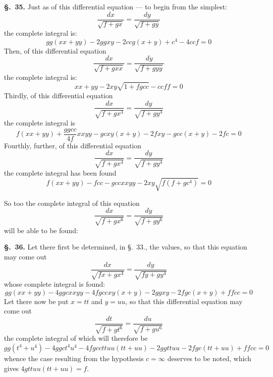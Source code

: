 \documentclass{article}
\begin{document}
\textbf{§.~35.} Just as of this differential equation — to begin from the simplest:
\[ \frac{dx}{\sqrt{f + gx}} = \frac{dy}{\sqrt{f + gy}} \]
the complete integral is:
\[ gg(xx + yy) - 2ggxy - 2ccg(x+y) + c^{4} - 4ccf = 0 \]
Then, of this differential equation
\[ \frac{dx}{\sqrt{f + gxx}} = \frac{dy}{\sqrt{f + gyy}} \]
the complete integral is:
\[ xx + yy - 2xy\sqrt{1 + fgcc} - ccff = 0 \]
Thirdly, of this differential equation
\[ \frac{dx}{\sqrt{f + gx^{3}}} = \frac{dy}{\sqrt{f + gy^{3}}} \]
the complete integral is
\[ f(xx + yy) + \frac{ggcc}{4f}xxyy - gcxy(x+y) - 2fxy - gcc(x+y) - 2fc = 0 \]
Fourthly, further, of this differential equation
\[ \frac{dx}{\sqrt{f + gx^{4}}} = \frac{dy}{\sqrt{f + gy^{4}}} \]
the complete integral has been found
\[ f(xx + yy) - fcc - gccxxyy - 2xy\sqrt{f(f + gc^{4})} = 0 \]

So too the complete integral of this equation
\[ \frac{dx}{\sqrt{f + gx^{6}}} = \frac{dy}{\sqrt{f + gy^{6}}} \]
will be able to be found:

\textbf{§.~36.} Let there first be determined, in §.~33., the values, so that this equation may come
out
\[ \frac{dx}{\sqrt{fx + gx^{4}}} = \frac{dy}{\sqrt{fy + gy^{4}}} \]
whose complete integral is found:
\[ gg(xx + yy) - 4ggcxxyy - 4fgccxy(x+y) - 2ggxy - 2fgc(x+y) + ffcc = 0 \]
Let there now be put $x = tt$ and $y = uu$, so that this differential equation may come out
\[ \frac{dt}{\sqrt{f + gt^{6}}} = \frac{du}{\sqrt{f + gu^{6}}} \]
the complete integral of which will therefore be
\[ gg(t^{4} + u^{4}) - 4ggct^{4}u^{4} - 4fgccttuu(tt+uu) - 2ggttuu - 2fgc(tt+uu) + ffcc = 0 \]
whence the case resulting from the hypothesis $c = \infty$ deserves to be noted, which gives
$4gttuu(tt+uu) = f$.
\end{document}
